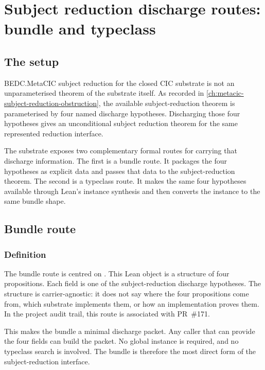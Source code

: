 \chapter{Subject reduction discharge routes: bundle and typeclass}
\label{ch:sr-discharge-routes}

\section{The setup}
\label{sec:sr-discharge-routes-setup}

BEDC.MetaCIC subject reduction for the closed CIC substrate is not
an unparameterised theorem of the substrate itself.
As recorded in \autoref{ch:metacic-subject-reduction-obstruction},
the available subject-reduction theorem is parameterised by four
named discharge hypotheses.
Discharging those four hypotheses gives an unconditional subject
reduction theorem for the same represented reduction interface.

The substrate exposes two complementary formal routes for carrying
that discharge information.
The first is a bundle route.
It packages the four hypotheses as explicit data and passes that
data to the subject-reduction theorem.
The second is a typeclass route.
It makes the same four hypotheses available through Lean's instance
synthesis and then converts the instance to the same bundle shape.

\section{Bundle route}
\label{sec:sr-discharge-routes-bundle-route}

\subsection{Definition}
\label{subsec:sr-discharge-routes-bundle-definition}

The bundle route is centred on
.
This Lean object is a structure of four propositions.
Each field is one of the subject-reduction discharge hypotheses.
The structure is carrier-agnostic:
it does not say where the four propositions come from,
which substrate implements them,
or how an implementation proves them.
In the project audit trail, this route is associated with PR~\#171.

This makes the bundle a minimal discharge packet.
Any caller that can provide the four fields can build the packet.
No global instance is required, and no typeclass search is involved.
The bundle is therefore the most direct form of the subject-reduction
interface.

